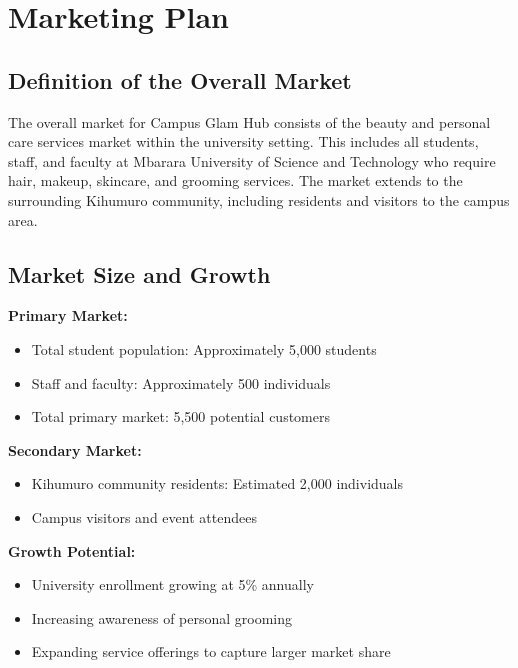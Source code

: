 \documentclass[a4paper,12pt]{article}
\begin{document}
\newpage
\section{Marketing Plan}

\subsection{Definition of the Overall Market}

The overall market for Campus Glam Hub consists of the beauty and personal care services market within the university setting. This includes all students, staff, and faculty at Mbarara University of Science and Technology who require hair, makeup, skincare, and grooming services. The market extends to the surrounding Kihumuro community, including residents and visitors to the campus area.

\subsection{Market Size and Growth}

\textbf{Primary Market:}
\begin{itemize}[leftmargin=2em]
    \item Total student population: Approximately 5,000 students
    \item Staff and faculty: Approximately 500 individuals
    \item Total primary market: 5,500 potential customers
\end{itemize}

\textbf{Secondary Market:}
\begin{itemize}[leftmargin=2em]
    \item Kihumuro community residents: Estimated 2,000 individuals
    \item Campus visitors and event attendees
\end{itemize}

\textbf{Growth Potential:}
\begin{itemize}[leftmargin=2em]
    \item University enrollment growing at 5\% annually
    \item Increasing awareness of personal grooming
    \item Expanding service offerings to capture larger market share
\end{itemize}

\vspace{1em}
\end{document}
